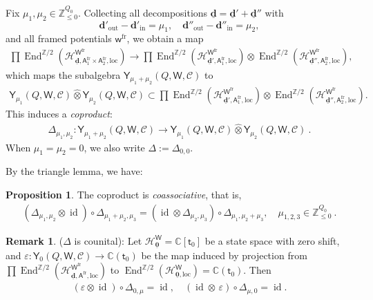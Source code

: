\documentclass[10pt]{amsart}
\theoremstyle{definition}
\newtheorem{Proposition}[Theorem]{Proposition}
\newtheorem{Remark}[Theorem]{Remark}
\numberwithin{equation}{section}
\newcommand{\bC}{\mathbb{C}}
\newcommand{\bZ}{\mathbb{Z}}
\newcommand{\bd}{\mathbf{d}}
\newcommand{\cH}{\mathcal{H}}
\newcommand{\loc}{\mathrm{loc}}
\newcommand{\sA}{\mathsf{A}}
\newcommand{\sW}{\mathsf{W}}
\newcommand{\sw}{\mathsf{w}}
\newcommand{\End}{\operatorname{End}}
\newcommand{\id}{\operatorname{id}}
\newcommand{\In}{\operatorname{in}}
\newcommand{\Out}{\operatorname{out}}
\begin{document}
Fix $\mu_1,\mu_2\in \bZ_{\leqslant 0}^{Q_0}$. Collecting all decompositions $\underline{\bd}=\underline{\bd}'+\underline{\bd}''$ with $$\bd'_{\Out}-\bd'_{\In}=\mu_1, \quad \bd''_{\Out}-\bd''_{\In}=\mu_2,$$ and all framed potentials $\sw^{\mathrm{fr}}$, we obtain a map
\begin{align*}
    \prod\End^{\bZ/2}(\cH^{\sW^{\mathrm{fr}}}_{\underline{\bd},\sA^{\mathrm{fr}}_1\times \sA^{\mathrm{fr}}_2,\loc})\to \prod \End^{\bZ/2}(\cH^{\sW^{\mathrm{fr}}}_{\underline{\bd}',\sA^{\mathrm{fr}}_1,\loc})\otimes \End^{\bZ/2}(\cH^{\sW^{\mathrm{fr}}}_{\underline{\bd}'', \sA^{\mathrm{fr}}_2,\loc}),
\end{align*}
which maps the subalgebra $\mathsf Y_{\mu_1+\mu_2}(Q,\sW,\mathcal C)$ to 
\begin{align*}
    \mathsf Y_{\mu_1}(Q,\sW,\mathcal C)\widehat{\otimes}\mathsf Y_{\mu_2}(Q,\sW,\mathcal C)\subset \prod \End^{\bZ/2}(\cH^{\sW^{\mathrm{fr}}}_{\underline{\bd}',\sA^{\mathrm{fr}}_1,\loc})\otimes \End^{\bZ/2}(\cH^{\sW^{\mathrm{fr}}}_{\underline{\bd}'', \sA^{\mathrm{fr}}_2,\loc}).
\end{align*}
This induces a \textit{coproduct}:
\begin{align*}
    \Delta_{\mu_1,\mu_2}\colon \mathsf Y_{\mu_1+\mu_2}(Q,\sW,\mathcal C)\to \mathsf Y_{\mu_1}(Q,\sW,\mathcal C)\widehat{\otimes}\mathsf Y_{\mu_2}(Q,\sW,\mathcal C)\:.
\end{align*}
When $\mu_1=\mu_2=0$, we also write $\Delta:=\Delta_{0,0}$. 

By the triangle lemma, we have: 
\begin{Proposition}
The coproduct is \textit{coassociative}, that is,
\begin{align*}
    (\Delta_{\mu_1,\mu_2}\otimes \id)\circ\Delta_{\mu_1+\mu_2,\mu_3}=(\id\otimes \Delta_{\mu_2,\mu_3})\circ\Delta_{\mu_1,\mu_2+\mu_3},\quad \mu_{1,2,3}\in \bZ_{\leqslant 0}^{Q_0}\:.
\end{align*}
\end{Proposition}

\begin{Remark}\label{rmk counit}
($\Delta$ is counital): Let $\cH^{\sW}_{\underline{\mathbf 0}}=\bC[\mathsf t_0]$ be a state space with zero shift, and $\varepsilon\colon \mathsf Y_{0}(Q,\sW,\mathcal C)\to \bC(\mathsf t_0)$ be the map induced by projection from $\prod\End^{\bZ/2}(\cH^{\sW^{\mathrm{fr}}}_{\underline{\bd},\sA^{\mathrm{fr}},\loc})$ to $\End^{\bZ/2}(\cH^{\sW}_{\underline{\mathbf 0},\loc})=\bC(\mathsf t_0)$. Then 
\begin{align*}
    (\varepsilon\otimes \id)\circ \Delta_{0,\mu}=\id,\quad (\id\otimes\, \varepsilon)\circ \Delta_{\mu,0}=\id.
\end{align*}
\end{Remark}
\end{document}
